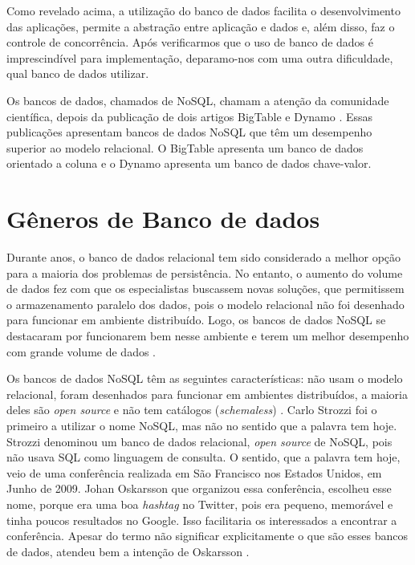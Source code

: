Como revelado acima, a utilização do banco de dados facilita o desenvolvimento das aplicações, permite a abstração entre aplicação e dados e, além disso, faz o controle de concorrência. Após verificarmos que o uso de banco de dados é imprescindível para implementação, deparamo-nos com uma outra dificuldade, qual banco de dados utilizar. 

Os bancos de dados, chamados de NoSQL, chamam a atenção da comunidade científica, depois da publicação de dois artigos BigTable \cite{bigtable} e Dynamo \cite{dynamo}. Essas publicações apresentam bancos de dados NoSQL que têm um desempenho superior ao modelo relacional. O BigTable apresenta um banco de dados orientado a coluna e o Dynamo apresenta um banco de dados chave-valor.

\section{Gêneros de Banco de dados}
\label{sec:databasetype}
Durante anos, o banco de dados relacional tem sido considerado a melhor opção para a maioria dos problemas de persistência. No entanto, o aumento do volume de dados fez com que os especialistas buscassem novas soluções, que permitissem o armazenamento paralelo dos dados, pois o modelo relacional não foi desenhado para funcionar em ambiente distribuído. Logo, os bancos de dados NoSQL se destacaram por funcionarem bem nesse ambiente e terem um melhor desempenho com grande volume de dados \cite{NoSQL}.

Os bancos de dados NoSQL têm as seguintes características: não usam o modelo relacional, foram desenhados para funcionar em ambientes distribuídos, a maioria deles são \textit{open source} e não tem catálogos (\textit{schemaless}) \cite{NoSQL}. Carlo Strozzi foi o primeiro a utilizar o nome NoSQL, mas não no sentido que a palavra tem hoje. Strozzi denominou um banco de dados relacional, \textit{open source} de NoSQL, pois não usava \ac{SQL} como linguagem de consulta. O sentido, que a palavra tem hoje, veio de uma conferência realizada em São Francisco nos Estados Unidos, em Junho de 2009. Johan Oskarsson que organizou essa conferência, escolheu esse nome, porque era uma boa \textit{hashtag} no Twitter, pois era pequeno, memorável e tinha poucos resultados no Google. Isso facilitaria os interessados a encontrar a conferência. Apesar do termo não significar explicitamente o que são esses bancos de dados, atendeu bem a intenção de Oskarsson \cite{NoSQL}.


